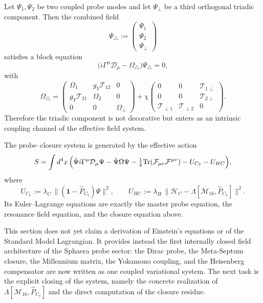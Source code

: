 \begin{proposition}
\label{prop:triadic-two-probe}
Let $\Psi_1,\Psi_2$ be two coupled probe modes and let $\Psi_\perp$ be a
third orthogonal triadic component.
Then the combined field
\[
  \Psi_{\triangle}
  :=
  \begin{pmatrix}
    \Psi_1\\
    \Psi_2\\
    \Psi_\perp
  \end{pmatrix}
\]
satisfies a block equation
\[
  \bigl(i\Gamma^\mu\mathcal D_\mu - \Omega_{\triangle}\bigr)
  \Psi_{\triangle}=0,
\]
with
\[
  \Omega_{\triangle}
  =
  \begin{pmatrix}
    \Omega_1 & g_Y\mathcal T_{12} & 0\\
    g_Y\mathcal T_{21} & \Omega_2 & 0\\
    0 & 0 & \Omega_\perp
  \end{pmatrix}
  +
  \chi
  \begin{pmatrix}
    0 & 0 & \mathcal T_{1\perp}\\
    0 & 0 & \mathcal T_{2\perp}\\
    \mathcal T_{\perp1} & \mathcal T_{\perp2} & 0
  \end{pmatrix}.
\]
Therefore the triadic component is not decorative but enters as an
intrinsic coupling channel of the effective field system.
\end{proposition}

\begin{theorem}
\label{thm:variational-form}
The probe--closure system is generated by the effective action
\[
  S
  =
  \int d^4x\,
  \Bigl(
    \bar\Psi i\Gamma^\mu\mathcal D_\mu\Psi
    - \bar\Psi\Omega\Psi
    - \tfrac14\mathrm{Tr}(\mathcal F_{\mu\nu}\mathcal F^{\mu\nu})
    - U_{C_7}
    - U_{HC}
  \Bigr),
\]
where
\[
  U_{C_7}
  :=
  \lambda_C\,
  \bigl\|(\mathbf 1-\hat P_{C_7})\Psi\bigr\|^2,
  \qquad
  U_{HC}
  :=
  \lambda_H\,
  \bigl\|\mathcal H_C - \Lambda[\mathcal M_{16},\hat P_{C_7}]\bigr\|^2.
\]
Its Euler--Lagrange equations are exactly the master probe equation,
the resonance field equation, and the closure equation above.
\end{theorem}

\begin{remark}
This section does not yet claim a derivation of Einstein's equations or
of the Standard Model Lagrangian.
It provides instead the first internally closed field architecture of
the Sphaera probe sector: the Dirac probe, the Meta-Septum closure, the
Millennium matrix, the Yokamono coupling, and the Heisenberg
compensator are now written as one coupled variational system.
The next task is the explicit closing of the system, namely the concrete
realization of $\Lambda[\mathcal M_{16},\hat P_{C_7}]$ and the direct
computation of the closure residue.

\end{remark}


